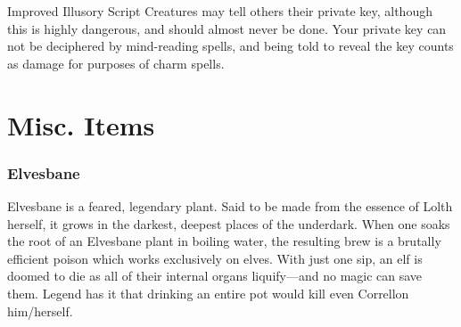 \begin{table}[hb]
\begin{multicols*}{2}
\begin{spell}{Improved Illusory Script}
Creatures may tell others their private key, although this is highly dangerous, and should almost never be done.
Your private key can not be deciphered by mind-reading spells, and being told to reveal the key counts as damage for purposes of charm spells.

\end{spell}

\section{Misc. Items}

\subsubsection*{Elvesbane}
Elvesbane is a feared, legendary plant.
Said to be made from the essence of Lolth herself, it grows in the darkest, deepest places of the underdark.
When one soaks the root of an Elvesbane plant in boiling water, the resulting brew is a brutally efficient poison which works exclusively on elves.
With just one sip, an elf is doomed to die as all of their internal organs liquify---and no magic can save them.
Legend has it that drinking an entire pot would kill even Correllon him/herself.

\end{multicols*}


\end{table}
